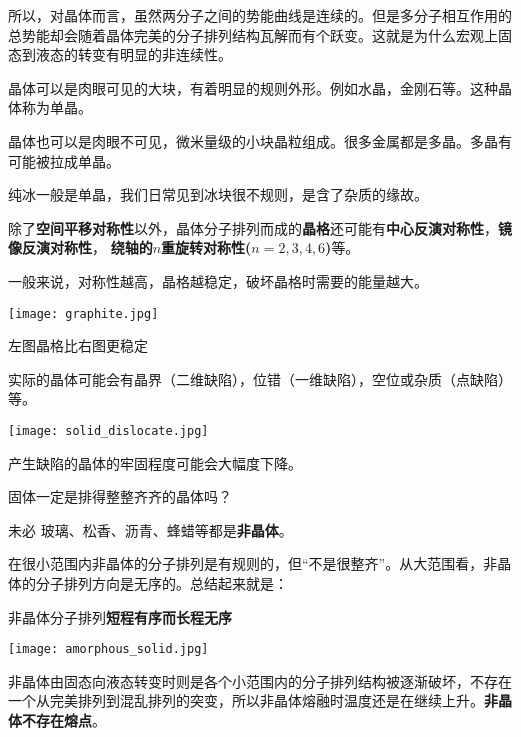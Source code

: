 \documentclass[CJK]{beamer}
\begin{document}
\begin{frame}
\bch
所以，对晶体而言，虽然两分子之间的势能曲线是连续的。但是多分子相互作用的总势能却会随着晶体完美的分子排列结构瓦解而有个跃变。这就是为什么宏观上固态到液态的转变有明显的非连续性。
\ech
\end{frame}

\begin{frame}
\bch
\bitem
\item{晶体可以是肉眼可见的大块，有着明显的规则外形。例如水晶，金刚石等。这种晶体称为单晶。}
\item{晶体也可以是肉眼不可见，微米量级的小块晶粒组成。很多金属都是多晶。多晶有可能被拉成单晶。}
\item{纯冰一般是单晶，我们日常见到冰块很不规则，是含了杂质的缘故。}
\eitem
\ech
\end{frame}


\begin{frame}
\bch
除了{\bf 空间平移对称性}以外，晶体分子排列而成的{\bf 晶格}还可能有{\bf 中心反演对称性}，{\bf 镜像反演对称性}， {\bf 绕轴的$n$重旋转对称性($n=2,3,4,6$)}等。

一般来说，对称性越高，晶格越稳定，破坏晶格时需要的能量越大。

\bcenter
\texttt{[image: graphite.jpg]}
\ecenter

左图晶格比右图更稳定
\ech
\end{frame}


\begin{frame}
\bch
实际的晶体可能会有晶界（二维缺陷），位错（一维缺陷），空位或杂质（点缺陷）等。

\bcenter
\texttt{[image: solid\_dislocate.jpg]}
\ecenter

产生缺陷的晶体的牢固程度可能会大幅度下降。
\ech
\end{frame}


\begin{frame}
\bch
固体一定是排得整整齐齐的晶体吗？

\skiplines

未必 \bye 玻璃、松香、沥青、蜂蜡等都是{\bf 非晶体}。
\ech
\end{frame}

\begin{frame}
\bch
在很小范围内非晶体的分子排列是有规则的，但“不是很整齐”。从大范围看，非晶体的分子排列方向是无序的。总结起来就是：

非晶体分子排列{\bf 短程有序而长程无序}

\skipline
\texttt{[image: amorphous\_solid.jpg]}

非晶体由固态向液态转变时则是各个小范围内的分子排列结构被逐渐破坏，不存在一个从完美排列到混乱排列的突变，所以非晶体熔融时温度还是在继续上升。{\bf 非晶体不存在熔点}。

\ech
\end{frame}
\end{document}
